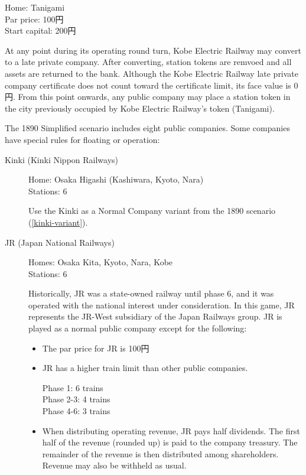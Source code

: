 \begin{multicols}{2}
\begin{description}
  Home: Tanigami \\
  Par price: 100円 \\
  Start capital: 200円

  At any point during its operating round turn, Kobe Electric Railway
  may convert to a late private company. After converting, station
  tokens are remvoed and all assets are returned to the bank. Although
  the Kobe Electric Railway late private company certificate does not
  count toward the certificate limit, its face value is 0円. From
  this point onwards, any public company may place a station token in
  the city previously occupied by Kobe Electric Railway's token
  (Tanigami).
\end{description}

The 1890 Simplified scenario includes eight public companies. Some
companies have special rules for floating or operation:
\begin{description}
\item[Kinki (Kinki Nippon Railways)] \hfill

Home: Osaka Higashi (Kashiwara, Kyoto, Nara) \\
Stations: 6

Use the Kinki as a Normal Company variant from the 1890 scenario
(\autoref{kinki-variant}).

\item[JR (Japan National Railways)]\hfill

Homes: Osaka Kita, Kyoto, Nara, Kobe \\
Stations: 6

Historically, JR was a state-owned railway until phase 6, and it was
operated with the national interest under consideration. In this game,
JR represents the JR-West subsidiary of the Japan Railways group. JR
is played as a normal public company except for the following:
\begin{itemize}
\item The par price for JR is 100円

\item JR has a higher train limit than other public companies.

Phase 1: 6 trains\\
Phase 2-3: 4 trains\\
Phase 4-6: 3 trains

\item When distributing operating revenue, JR pays half
  dividends. The first half of the revenue (rounded up) is paid to the
  company treasury. The remainder of the revenue is then distributed
  among shareholders. Revenue may also be withheld as usual.


\end{itemize}
\end{description}
\end{multicols}
